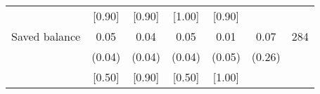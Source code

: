 \begin{table}[ht]
{\begin{threeparttable}
\begin{tabular}{l*{6}{c}}
          &   [0.90]&   [0.90]&   [1.00]&   [0.90]&         &         \\
Saved balance&     0.05&     0.04&     0.05&     0.01&     0.07&      284\\
          &   (0.04)&   (0.04)&   (0.04)&   (0.05)&   (0.26)&         \\
          &   [0.50]&   [0.90]&   [0.50]&   [1.00]&         &         \\
\bottomrule \end{tabular} \begin{tablenotes}[flushleft] \footnotesize \item  \end{tablenotes} \end{threeparttable} } \end{table}
